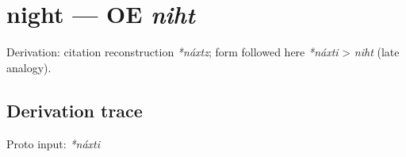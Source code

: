 \documentclass[
  british,
  a4paper,
  openany]{book}
\providecommand{\texorpdfstring}[2]{#1}
\begin{document}
\section{\texorpdfstring{night --- OE
\emph{niht}}{night --- OE niht}}\label{night-oe-niht}


Derivation: citation reconstruction \emph{*náxtz}; form followed here
\emph{*náxti} \textgreater{} \emph{niht} (late analogy).

\subsection{Derivation trace}\label{derivation-trace-120}

Proto input: \emph{*náxti}

\begingroup
\setlength{\fboxsep}{6pt}
\end{document}
